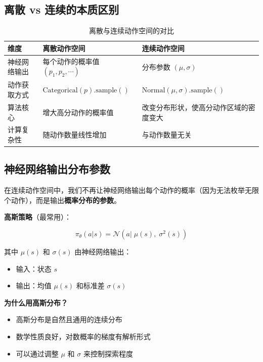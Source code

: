 \documentclass[12pt,a4paper]{article}
\theoremstyle{noteplain}
\theoremstyle{noteexercise}
\begin{document}
\subsection{离散 vs 连续的本质区别}\label{ssec:discrete-vs-continuous}

\begin{table}[H]
  \centering
  \caption{离散与连续动作空间的对比}
  \label{tab:cont-comparison}
  \begin{tabular}{>{\centering\arraybackslash}m{3.5cm}
                 >{\centering\arraybackslash}m{4.5cm}
                 >{\centering\arraybackslash}m{4.5cm}}
    \toprule
    \textbf{维度} & \textbf{离散动作空间} & \textbf{连续动作空间} \\
    \midrule
    神经网络输出 & 每个动作的概率值 $(p_1,p_2,\cdots)$ & 分布参数 $(\mu,\sigma)$ \\
    \midrule
    动作获取方式 & $\text{Categorical}(p).\text{sample}()$ & $\text{Normal}(\mu,\sigma).\text{sample}()$ \\
    \midrule
    算法核心 & 增大高分动作的概率值 & 改变分布形状，使高分动作区域的密度变大 \\
    \midrule
    计算复杂性 & 随动作数量线性增加 & 与动作数量无关 \\
    \bottomrule
  \end{tabular}
\end{table}

\subsection{神经网络输出分布参数}\label{ssec:gaussian-policy}

在连续动作空间中，我们不再让神经网络输出每个动作的概率（因为无法枚举无限个动作），而是输出\textbf{概率分布的参数}。

\textbf{高斯策略}（最常用）：

\begin{equation}\label{eq:gaussian}
  \pi_\theta(a|s) = \mathcal{N}(a|\;\mu(s),\;\sigma^2(s))
\end{equation}

其中 $\mu(s)$ 和 $\sigma(s)$ 由神经网络输出：
\begin{itemize}
  \setlength{\itemsep}{0.2em}
  \item 输入：状态 $s$
  \item 输出：均值 $\mu(s)$ 和标准差 $\sigma(s)$
\end{itemize}

\textbf{为什么用高斯分布？}
\begin{itemize}
  \setlength{\itemsep}{0.2em}
  \item 高斯分布是自然且通用的连续分布
  \item 数学性质良好，对数概率的梯度有解析形式
  \item 可以通过调整 $\mu$ 和 $\sigma$ 来控制探索程度
\end{itemize}
\end{document}
